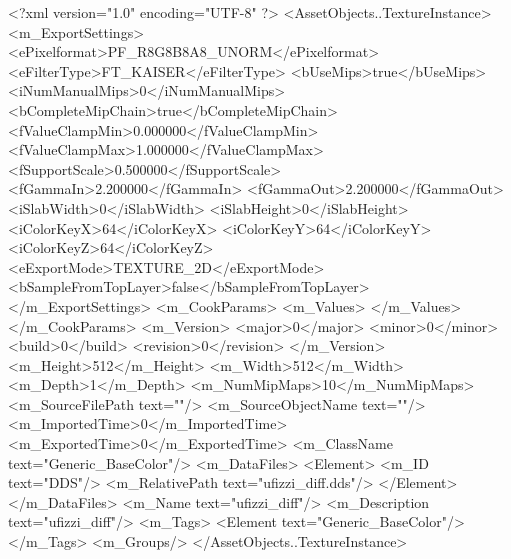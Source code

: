 <?xml version="1.0" encoding="UTF-8" ?>
<AssetObjects..TextureInstance>
<m_ExportSettings>
<ePixelformat>PF_R8G8B8A8_UNORM</ePixelformat>
<eFilterType>FT_KAISER</eFilterType>
<bUseMips>true</bUseMips>
<iNumManualMips>0</iNumManualMips>
<bCompleteMipChain>true</bCompleteMipChain>
<fValueClampMin>0.000000</fValueClampMin>
<fValueClampMax>1.000000</fValueClampMax>
<fSupportScale>0.500000</fSupportScale>
<fGammaIn>2.200000</fGammaIn>
<fGammaOut>2.200000</fGammaOut>
<iSlabWidth>0</iSlabWidth>
<iSlabHeight>0</iSlabHeight>
<iColorKeyX>64</iColorKeyX>
<iColorKeyY>64</iColorKeyY>
<iColorKeyZ>64</iColorKeyZ>
<eExportMode>TEXTURE_2D</eExportMode>
<bSampleFromTopLayer>false</bSampleFromTopLayer>
</m_ExportSettings>
<m_CookParams>
<m_Values>
</m_Values>
</m_CookParams>
<m_Version>
<major>0</major>
<minor>0</minor>
<build>0</build>
<revision>0</revision>
</m_Version>
<m_Height>512</m_Height>
<m_Width>512</m_Width>
<m_Depth>1</m_Depth>
<m_NumMipMaps>10</m_NumMipMaps>
<m_SourceFilePath text=""/>
<m_SourceObjectName text=""/>
<m_ImportedTime>0</m_ImportedTime>
<m_ExportedTime>0</m_ExportedTime>
<m_ClassName text="Generic_BaseColor"/>
<m_DataFiles>
<Element>
<m_ID text="DDS"/>
<m_RelativePath text="ufizzi_diff.dds"/>
</Element>
</m_DataFiles>
<m_Name text="ufizzi_diff"/>
<m_Description text="ufizzi_diff"/>
<m_Tags>
<Element text="Generic_BaseColor"/>
</m_Tags>
<m_Groups/>
</AssetObjects..TextureInstance>
